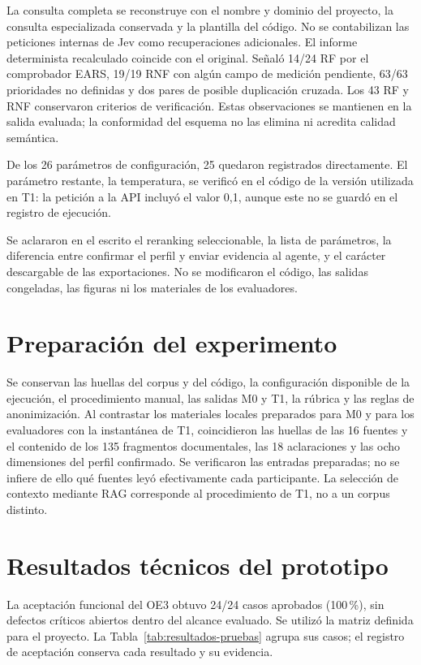 La consulta completa se reconstruye con el nombre y dominio del proyecto, la consulta especializada conservada y la plantilla del código. No se contabilizan las peticiones internas de Jev como recuperaciones adicionales. El informe determinista recalculado coincide con el original. Señaló 14/24 RF por el comprobador EARS, 19/19 RNF con algún campo de medición pendiente, 63/63 prioridades no definidas y dos pares de posible duplicación cruzada. Los 43 RF y RNF conservaron criterios de verificación. Estas observaciones se mantienen en la salida evaluada; la conformidad del esquema no las elimina ni acredita calidad semántica.

De los 26 parámetros de configuración, 25 quedaron registrados directamente. El parámetro restante, la temperatura, se verificó en el código de la versión utilizada en T1: la petición a la API incluyó el valor 0,1, aunque este no se guardó en el registro de ejecución.

Se aclararon en el escrito el reranking seleccionable, la lista de parámetros, la diferencia entre confirmar el perfil y enviar evidencia al agente, y el carácter descargable de las exportaciones. No se modificaron el código, las salidas congeladas, las figuras ni los materiales de los evaluadores.

\section{Preparación del experimento}

Se conservan las huellas del corpus y del código, la configuración disponible de la ejecución, el procedimiento manual, las salidas M0 y T1, la rúbrica y las reglas de anonimización. Al contrastar los materiales locales preparados para M0 y para los evaluadores con la instantánea de T1, coincidieron las huellas de las 16 fuentes y el contenido de los 135 fragmentos documentales, las 18 aclaraciones y las ocho dimensiones del perfil confirmado. Se verificaron las entradas preparadas; no se infiere de ello qué fuentes leyó efectivamente cada participante. La selección de contexto mediante RAG corresponde al procedimiento de T1, no a un corpus distinto.

\section{Resultados técnicos del prototipo}

La aceptación funcional del OE3 obtuvo 24/24 casos aprobados (100\,\%), sin defectos críticos abiertos dentro del alcance evaluado. Se utilizó la matriz definida para el proyecto. La Tabla~\ref{tab:resultados-pruebas} agrupa sus casos; el registro de aceptación conserva cada resultado y su evidencia.


